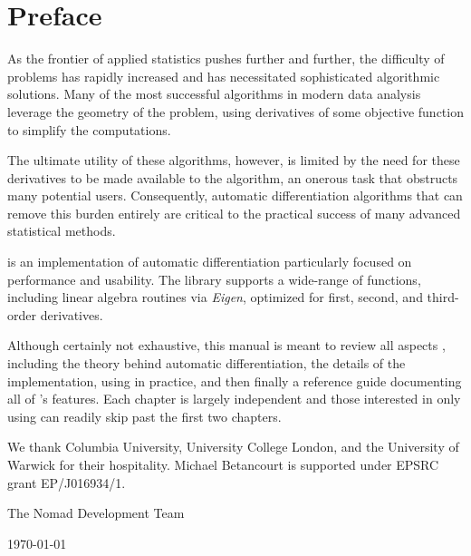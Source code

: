 \chapter*{Preface}

As the frontier of applied statistics pushes further and further, the
difficulty of problems has rapidly increased and has necessitated
sophisticated algorithmic solutions.  Many of the most successful
algorithms in modern data analysis leverage the geometry of the
problem, using derivatives of some objective function to simplify
the computations.

The ultimate utility of these algorithms, however, is limited by the
need for these derivatives to be made available to the algorithm,
an onerous task that obstructs many potential users.  Consequently,
automatic differentiation algorithms that can remove this burden
entirely are critical to the practical success of many advanced
statistical methods.

\nomad is an implementation of automatic differentiation particularly 
focused on performance and usability.  The library supports a wide-range 
of functions, including linear algebra routines via \textit{Eigen}, optimized
for first, second, and third-order derivatives.

Although certainly not exhaustive, this manual is meant to review
all aspects \nomad, including the theory behind automatic differentiation,
the details of the \nomad implementation, using \nomad in practice,
and then finally a reference guide documenting all of \nomad's features.
Each chapter is largely independent and those interested in only using
\nomad can readily skip past the first two chapters.

We thank Columbia University, University College London, and the University
of Warwick for their hospitality.  Michael Betancourt is supported under EPSRC 
grant EP/J016934/1.

\vspace{5mm}
\hfill The Nomad Development Team

\hfill \today